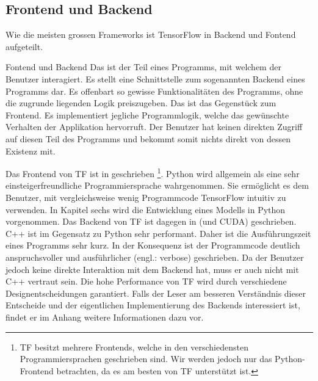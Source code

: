 \subsection{Frontend und Backend}
Wie die meisten grossen Frameworks ist TensorFlow in Backend und
Fontend aufgeteilt.
\para{}
\begin{infobox}{Fontend und Backend}
  Das  ist der Teil eines Programms, mit welchem der Benutzer
  interagiert. Es stellt eine Schnittstelle zum sogenannten Backend eines
  Programms dar. Es offenbart so gewisse Funktionalitäten des Programms,
  ohne die zugrunde liegenden Logik preiszugeben.
  \para{}
  Das  ist das Gegenstück zum Frontend. Es implementiert
  jegliche Programmlogik, welche das gewünschte Verhalten der Applikation
  hervorruft. Der Benutzer hat keinen direkten Zugriff auf diesen Teil des
  Programms und bekommt somit nichts direkt von dessen Existenz mit.
\end{infobox}
\para{}
Das Frontend von TF ist in  geschrieben%
\footnote{
  TF besitzt mehrere Frontends, welche in den verschiedensten
  Programmiersprachen geschrieben sind. Wir werden jedoch nur das
  Python-Frontend betrachten, da es am besten von TF unterstützt ist.
}.
Python wird allgemein als eine sehr einsteigerfreundliche Programmiersprache wahrgenommen. Sie
ermöglicht es dem Benutzer, mit vergleichsweise wenig Programmcode TensorFlow intuitiv zu verwenden.
In Kapitel sechs wird die Entwicklung eines Modells in Python vorgenommen.
\para{}
Das Backend von TF ist dagegen in  (und CUDA)
geschrieben. C++ ist im Gegensatz zu Python sehr performant.
Daher ist die Ausführungszeit eines Programms sehr kurz. In
der Konsequenz ist der Programmcode deutlich anspruchsvoller und
ausführlicher (engl.: verbose) geschrieben.
Da der Benutzer jedoch keine direkte Interaktion mit dem Backend hat, muss er
auch nicht mit C++ vertraut sein.
\para{}
Die hohe Performance von TF wird durch verschiedene Designentscheidungen garantiert.
Falls der Leser am besseren Verständnis dieser Entscheide und der eigentlichen
Implementierung des Backends interessiert ist, findet er im Anhang
 weitere Informationen dazu vor.

